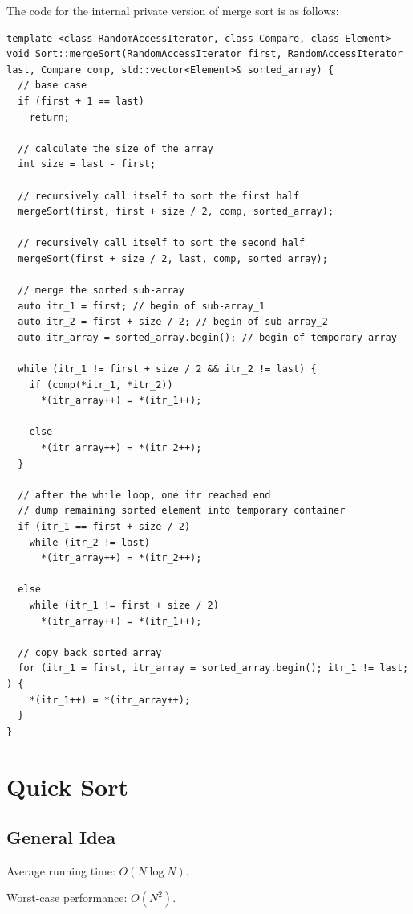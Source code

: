 \documentclass[11pt]{book}
\begin{document}
The code for the internal private version of merge sort is as follows:
\begin{verbatim}
template <class RandomAccessIterator, class Compare, class Element>
void Sort::mergeSort(RandomAccessIterator first, RandomAccessIterator last, Compare comp, std::vector<Element>& sorted_array) {
  // base case 
  if (first + 1 == last)
    return;

  // calculate the size of the array
  int size = last - first;

  // recursively call itself to sort the first half 
  mergeSort(first, first + size / 2, comp, sorted_array);

  // recursively call itself to sort the second half 
  mergeSort(first + size / 2, last, comp, sorted_array);

  // merge the sorted sub-array 
  auto itr_1 = first; // begin of sub-array_1
  auto itr_2 = first + size / 2; // begin of sub-array_2
  auto itr_array = sorted_array.begin(); // begin of temporary array

  while (itr_1 != first + size / 2 && itr_2 != last) {
    if (comp(*itr_1, *itr_2))
      *(itr_array++) = *(itr_1++);

    else 
      *(itr_array++) = *(itr_2++);    
  }

  // after the while loop, one itr reached end
  // dump remaining sorted element into temporary container 
  if (itr_1 == first + size / 2)
    while (itr_2 != last)
      *(itr_array++) = *(itr_2++);

  else
    while (itr_1 != first + size / 2)
      *(itr_array++) = *(itr_1++);

  // copy back sorted array
  for (itr_1 = first, itr_array = sorted_array.begin(); itr_1 != last; ) {
    *(itr_1++) = *(itr_array++);
  }
}

\end{verbatim}
\chapter{Quick Sort}
\label{sec:org9e68f52}
\section{General Idea}
\label{sec:org43f0c6c}

Average running time: \(O(N\log{N})\).

Worst-case performance: \(O(N^2)\).
\end{document}
